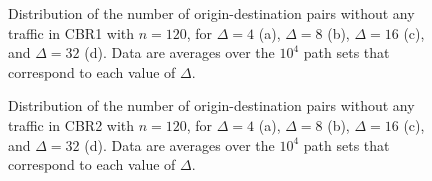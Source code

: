 \documentclass{article}
\begin{document}
\begin{figure}[t]
\centering
{}
\caption[Origin-destination pairs without any traffic in CBR1]{Distribution of
the number of origin-destination pairs without any traffic in CBR1 with $n=120$,
for $\Delta=4$ (a), $\Delta=8$ (b), $\Delta=16$ (c), and $\Delta=32$ (d). Data
are averages over the $10^4$ path sets that correspond to each value of
$\Delta$.}
\label{figureS8}
\end{figure}

\begin{figure}[t]
\centering
{}
\caption[Origin-destination pairs without any traffic in CBR2]{Distribution of
the number of origin-destination pairs without any traffic in CBR2 with $n=120$,
for $\Delta=4$ (a), $\Delta=8$ (b), $\Delta=16$ (c), and $\Delta=32$ (d). Data
are averages over the $10^4$ path sets that correspond to each value of
$\Delta$.}
\label{figureS9}
\end{figure}

 
\end{document}
